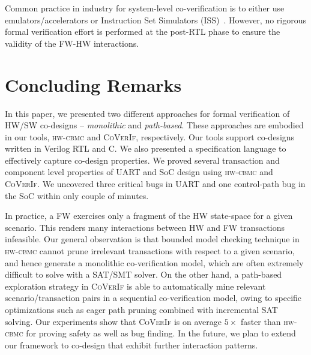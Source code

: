 \documentclass[sigconf]{acmart}
\newcommand{\tool}[1]{\textsc{#1}\xspace}
\newcommand{\hwcbmcv}{\tool{hw-cbmc}}
\newcommand{\verifox}{\tool{CoVerIf}}
\newcommand{\Omit}[1]{}
\begin{document}
\Omit{
A system is comprised of a set of concurrent FW and HW models, which
interleave asynchronously.  Malik et al.~in~\cite{hvc} showed 
that these patterns are meaningful in further
settings -- a Linux device driver interacting with x86 QEMU emulator code or
a Rockbox firmware interacting with an iAudio X5 device.  Practical industrial 
co-designs, such as IBM Text Accelerator co-design~\cite{polig2014micro,polig2014fpl} 
and IBM coherent FFT coprocessor~\cite{giefers2015accelerating} also exhibits
producer-consumer interaction pattern. 
}
Common practice in industry for system-level co-verification is to 
either use emulators/accelerators or Instruction Set Simulators 
(ISS)~\cite{coverif-book}.  However, no rigorous formal verification 
effort is performed at the post-RTL phase to ensure the validity of the
FW-HW interactions.  

\Omit{
The concept of symbolic execution~\cite{DBLP:journals/tse/Clarke76,
DBLP:conf/pldi/GodefroidKS05, DBLP:conf/osdi/CadarDE08} is prevalent in the
software domain for automated test generation as well as bug finding.  This
technique is different from the symbolic simulation techniques that are used
in the hardware domain.  In this paper, we apply path-wise symbolic execution
to mine relevant scenario/transaction pairs for effective co-verification of 
a unified co-verification model.  
}
\section{Concluding Remarks}
%
In this paper, we presented two different approaches for formal verification of 
HW/SW co-designs -- \emph{monolithic} and \emph{path-based}.  These approaches are 
embodied in our tools, \hwcbmcv and \verifox, respectively.  Our tools support 
co-designs written in Verilog RTL and C.  We also presented a specification language to 
effectively capture co-design properties.  We proved several transaction and component 
level properties of UART and SoC design using \hwcbmcv and \verifox.  We uncovered three 
critical bugs in UART and one control-path bug in the SoC within only couple of minutes. 

In practice, a FW exercises only a fragment of the HW state-space for a given scenario.  
This renders many interactions between HW and FW transactions infeasible.   
Our general observation is that bounded model checking technique in \hwcbmcv 
cannot prune irrelevant transactions with respect to a given scenario, 
and hence generate a monolithic co-verification model, which are often 
extremely difficult to solve with a SAT/SMT solver. On the other hand, 
a path-based exploration strategy in \verifox is able to automatically 
mine relevant scenario/transaction pairs in a sequential co-verification 
model, owing to specific optimizations such as eager path pruning
combined with incremental SAT solving.  Our experiments show that \verifox 
is on average $5\times$ faster than \hwcbmcv for proving safety as well as bug
finding.  In the future, we plan to extend our framework to co-design 
that exhibit further interaction patterns.

%

 
\end{document}
